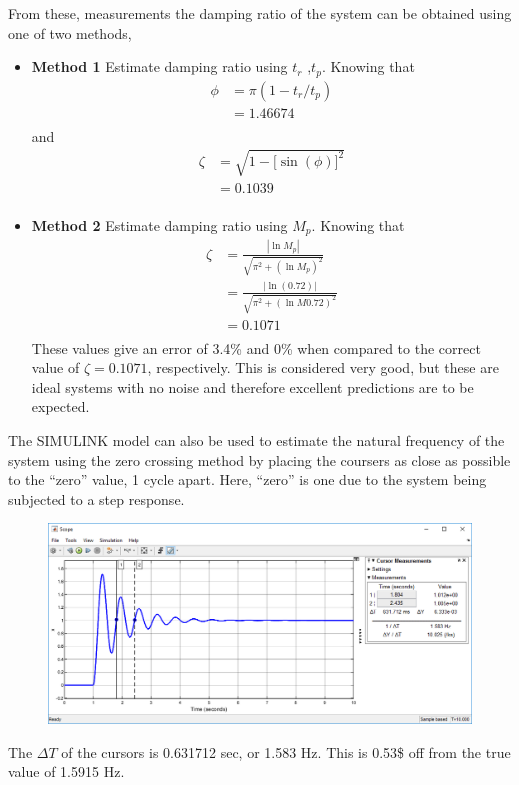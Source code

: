 \documentclass[12pt,letter]{article}
\begin{document}
\begin{example}
From these, measurements the damping ratio of the system can be obtained using one of two methods, 
\begin{itemize}
\item \textbf{Method 1} Estimate damping ratio using $t_r$ ,$t_p$. Knowing that 
\begin{align}
\phi &= \pi(1-t_r/t_p) \\
&= 1.46674 \nonumber \\
\end{align}
and 
\begin{align}
\zeta &= \sqrt{1-\big[\sin (\phi)\big]^2} \\
&= 0.1039 \nonumber \\
\end{align}
\item \textbf{Method 2} Estimate damping ratio using $M_p$. Knowing that 
\begin{align}
\zeta &= \frac{|\ln M_p|}{\sqrt{\pi^2 + (\ln M_p)^2}} \\
&= \frac{|\ln (0.72)|}{\sqrt{\pi^2 + (\ln M0.72)^2}} \nonumber \\
&=  0.1071 \nonumber \\
\end{align}
These values give an error of 3.4\% and 0\% when compared to the correct value of $\zeta = 0.1071$, respectively. This is considered very good, but these are ideal systems with no noise and therefore excellent predictions are to be expected. 
\end{itemize}

The SIMULINK model can also be used to estimate the natural frequency of the system using the zero crossing method by placing the coursers as close as possible to the ``zero'' value, 1 cycle apart. Here, ``zero'' is one due to the system being subjected to a step response.
\begin{figure}[H]
	\centering
	\includegraphics[width=6.0in]{../figures/Simulink_step_model_transfer_cursor_measurements_2nd_oder_3}
\end{figure}
The $\Delta T$ of the cursors is 0.631712 sec, or 1.583 Hz. This is 0.53\$ off from the true value of 1.5915 Hz. 
\end{example}
\end{document}
